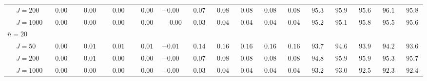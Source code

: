\begin{sidewaystable}
\begin{threeparttable}
\begin{tabular}{llccccccccccccccc}
 & \nopagebreak $\;J=200$  & $\phantom{-}0.00\phantom{0}$ & $\phantom{-}0.00\phantom{0}$ & $\phantom{-}0.00\phantom{0}$ & $\phantom{-}0.00\phantom{0}$ & ${-}0.00\phantom{0}$ & $\phantom{0}0.07\phantom{0}$ & $\phantom{0}0.08\phantom{0}$ & $\phantom{0}0.08\phantom{0}$ & $\phantom{0}0.08\phantom{0}$ & $\phantom{0}0.08\phantom{0}$ & $\phantom{0}95.3\phantom{0}$ & $\phantom{0}95.9\phantom{0}$ & $\phantom{0}95.6\phantom{0}$ & $\phantom{0}96.1\phantom{0}$ & $\phantom{0}95.8\phantom{0}$ \\
 & \nopagebreak $\;J=1000$  & $\phantom{-}0.00\phantom{0}$ & $\phantom{-}0.00\phantom{0}$ & $\phantom{-}0.00\phantom{0}$ & $\phantom{-}0.00\phantom{0}$ & $\phantom{-}0.00\phantom{0}$ & $\phantom{0}0.03\phantom{0}$ & $\phantom{0}0.04\phantom{0}$ & $\phantom{0}0.04\phantom{0}$ & $\phantom{0}0.04\phantom{0}$ & $\phantom{0}0.04\phantom{0}$ & $\phantom{0}95.2\phantom{0}$ & $\phantom{0}95.1\phantom{0}$ & $\phantom{0}95.8\phantom{0}$ & $\phantom{0}95.5\phantom{0}$ & $\phantom{0}95.6\phantom{0}$ \\
\multicolumn{4}{l}{$\bar{n}=20$} \\  & \nopagebreak $\;J=50$  & $\phantom{-}0.00\phantom{0}$ & $\phantom{-}0.01\phantom{0}$ & $\phantom{-}0.01\phantom{0}$ & $\phantom{-}0.01\phantom{0}$ & ${-}0.01\phantom{0}$ & $\phantom{0}0.14\phantom{0}$ & $\phantom{0}0.16\phantom{0}$ & $\phantom{0}0.16\phantom{0}$ & $\phantom{0}0.16\phantom{0}$ & $\phantom{0}0.16\phantom{0}$ & $\phantom{0}93.7\phantom{0}$ & $\phantom{0}94.6\phantom{0}$ & $\phantom{0}93.9\phantom{0}$ & $\phantom{0}94.2\phantom{0}$ & $\phantom{0}93.6\phantom{0}$ \\
 & \nopagebreak $\;J=200$  & $\phantom{-}0.00\phantom{0}$ & $\phantom{-}0.01\phantom{0}$ & $\phantom{-}0.00\phantom{0}$ & $\phantom{-}0.00\phantom{0}$ & ${-}0.00\phantom{0}$ & $\phantom{0}0.07\phantom{0}$ & $\phantom{0}0.08\phantom{0}$ & $\phantom{0}0.08\phantom{0}$ & $\phantom{0}0.08\phantom{0}$ & $\phantom{0}0.08\phantom{0}$ & $\phantom{0}94.8\phantom{0}$ & $\phantom{0}95.9\phantom{0}$ & $\phantom{0}95.9\phantom{0}$ & $\phantom{0}95.3\phantom{0}$ & $\phantom{0}95.7\phantom{0}$ \\
 & \nopagebreak $\;J=1000$  & $\phantom{-}0.00\phantom{0}$ & $\phantom{-}0.00\phantom{0}$ & $\phantom{-}0.00\phantom{0}$ & $\phantom{-}0.00\phantom{0}$ & ${-}0.00\phantom{0}$ & $\phantom{0}0.03\phantom{0}$ & $\phantom{0}0.04\phantom{0}$ & $\phantom{0}0.04\phantom{0}$ & $\phantom{0}0.04\phantom{0}$ & $\phantom{0}0.04\phantom{0}$ & $\phantom{0}93.2\phantom{0}$ & $\phantom{0}93.0\phantom{0}$ & $\phantom{0}92.5\phantom{0}$ & $\phantom{0}92.3\phantom{0}$ & $\phantom{0}92.4\phantom{0}$ \\

\end{tabular}
\end{threeparttable}
\end{sidewaystable}
